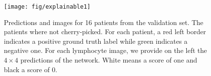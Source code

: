 \documentclass[final]{cvpr}
\begin{document}
	{\small
		
		
	}

	\begin{figure}[t]
		\begin{center}
			\texttt{[image: fig/explainable1]}
		\end{center}
		\caption{Predictions and images for 16 patients from the validation set. The patients where not cherry-picked. For each patient, a red left border indicates a positive ground truth label while green indicates a negative one. For each lymphocyte image, we provide on the left the $4\times 4$ predictions of the network. White means a score of one and black a score of 0.}
		\label{fig:explaina}
	\end{figure}
\end{document}
